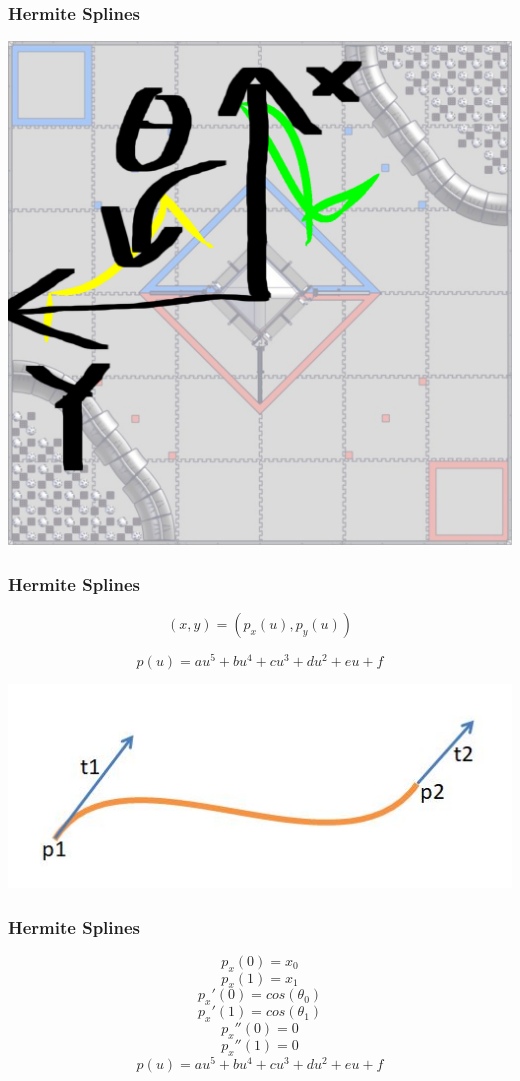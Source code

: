 \documentclass{beamer}
\begin{document}
\begin{frame}
	\frametitle{Hermite Splines}
	\centering
	\includegraphics[width=.6\textwidth]{coordinate.png}

\end{frame}

\begin{frame}
	\frametitle{Hermite Splines}
	$$(x, y) = \left( p_x(u), p_y(u) \right)$$

	$$p(u) = au^5 + bu^4 + cu^3 + du^2 + eu + f$$

	\centering
	
	\includegraphics[width=.7\textwidth]{hermite.jpg}

	
\end{frame}

\begin{frame}
	\frametitle{Hermite Splines}
	$$p_x(0) = x_0$$ $$  p_x(1) = x_1$$
	$$p_x'(0) = cos(\theta_0)$$ $$ p_x'(1) = cos(\theta_1)$$
	$$p_x''(0) = 0$$ $$ p_x''(1) = 0$$
	$$p(u) = au^5 + bu^4 + cu^3 + du^2 + eu + f$$
\end{frame}
\end{document}
